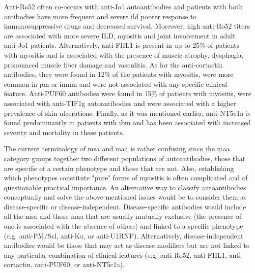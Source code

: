 Anti-Ro52 often co-occurs with anti-Jo1 autoantibodies and patients with both antibodies have more frequent and severe \gls{ild} poorer response to immunosuppressive drugs and decreased survival.\cite{PinalFernandez2017a,Vancsa2009,Bauhammer2016,Marie2012} Moreover, high anti-Ro52 titers are associated with more severe ILD, myositis and joint involvement in adult anti-Jo1 patients.\cite{PinalFernandez2017a,Vancsa2009,Bauhammer2016,Marie2012} Alternatively, anti-FHL1 is present in up to 25\% of patients with myositis and is associated with the presence of muscle atrophy, dysphagia, pronounced muscle fiber damage and vasculitis.\cite{Albrecht2015} As for the anti-cortactin antibodies, they were found in 12\% of the patients with myositis, were more common in \gls{pm} or \gls{imnm} and were not associated with any specific clinical feature.\cite{LabradorHorrillo2014a} Anti-PUF60 antibodies were found in 15\% of patients with myositis, were associated with anti-TIF1g autoantibodies and were associated with a higher prevalence of skin ulcerations.\cite{Fiorentino2016,Zhang2018} Finally, as it was mentioned earlier, anti-NT5c1a is found predominantly in patients with \gls{ibm} and has been associated with increased severity and mortality in these patients.\cite{Lloyd2016,Herbert2016,Muro2017,Lilleker2017,Goyal2016}

The current terminology of \gls{msa} and \gls{maa} is rather confusing since the \gls{maa} category groups together two different populations of autoantibodies, those that are specific of a certain phenotype and those that are not. Also, establishing which phenotypes constitute "pure" forms of myositis is often complicated and of questionable practical importance. An alternative way to classify autoantibodies conceptually and solve the above-mentioned issues would be to consider them as disease-specific or disease-independent. Disease-specific antibodies would include all the \gls{msa} and those \gls{maa} that are usually mutually exclusive (the presence of one is associated with the absence of others) and linked to a specific phenotype (e.g. anti-PM/Scl, anti-Ku, or anti-U1RNP). Alternatively, disease-independent antibodies would be those that may act as disease modifiers but are not linked to any particular combination of clinical features (e.g. anti-Ro52, anti-FHL1, anti-cortactin, anti-PUF60, or anti-NT5c1a).
